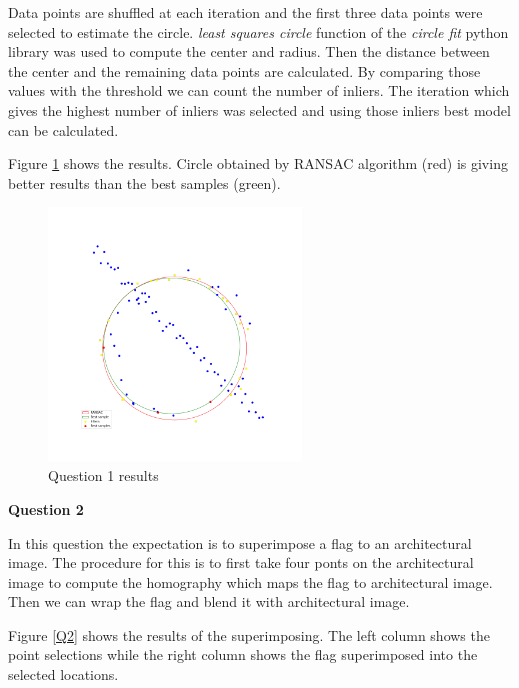 \documentclass[11pt]{article}
\begin{document}
\noindent Data points are shuffled at each iteration and the first three data points were selected to estimate the circle. \textit{least squares circle} 
function of the \textit{circle fit} python library was used to compute the center and radius. Then the distance between the center and the remaining 
data points are calculated. By comparing those values with the threshold we can count the number of inliers. The iteration which gives the highest
number of inliers was selected and using those inliers best model can be calculated. 

\noindent Figure \ref{RANSAC} shows the results. Circle obtained by RANSAC algorithm (red) is giving better results than the best samples (green). \\

\begin{figure}[!h]
    \centering
    \includegraphics[width=0.6\textwidth]{Images/1.png}
    \caption{Question 1 results}
    \label{RANSAC}
\end{figure}

\newpage
\noindent \textbf{Question 2}

\noindent In this question the expectation is to superimpose a flag to an architectural image. The procedure for this is to first take four ponts
on the architectural image to compute the homography which maps the flag to architectural image. Then we can wrap the flag and blend it with architectural
image. 

\noindent Figure \ref{Q2} shows the results of the superimposing. The left column shows the point selections while the right column shows
the flag superimposed into the selected locations. \\
\end{document}
